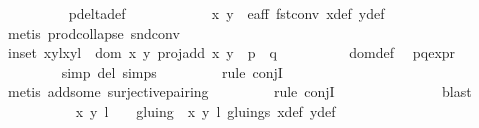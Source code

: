 \begin{isabellebody}
\ \ \ \ \ \ \ \ \isamarkupfalse%
\ p{\isacharunderscore}delta{\isacharprime}{\isacharunderscore}def\ \isanewline
\ \ \ \ \ \ \ \ \isamarkupfalse%
\ {\isacartoucheopen}{\isasymtau}\ {\isacharparenleft}x{\isacharprime}{\isacharcomma}\ y{\isacharprime}{\isacharparenright}\ {\isasymin}\ e{\isacharunderscore}aff{\isacartoucheclose}\ fst{\isacharunderscore}conv\ x{\isacharprime}{\isacharprime}{\isacharunderscore}def\ y{\isacharprime}{\isacharprime}{\isacharunderscore}def\ \isanewline
\ \ \ \ \ \ \ \ \isamarkupfalse%
\ {\isacharparenleft}metis\ prod{\isachardot}collapse\ snd{\isacharunderscore}conv{\isacharparenright}\isanewline
\ \ \ \ \ \ \isamarkupfalse%
\ in{\isacharunderscore}set{\isacharcolon}\ {\isachardoublequoteopen}{\isacharparenleft}{\isacharparenleft}{\isacharparenleft}x{\isacharcomma}y{\isacharparenright}{\isacharcomma}l{\isacharparenright}{\isacharcomma}{\isacharparenleft}{\isacharparenleft}x{\isacharprime}{\isacharprime}{\isacharcomma}y{\isacharprime}{\isacharprime}{\isacharparenright}{\isacharcomma}l{\isacharprime}{\isacharplus}{}{\isacharparenright}{\isacharparenright}\ {\isasymin}\ {\isacharparenleft}dom\ {\isacharparenleft}{\isasymlambda}{\isacharparenleft}x{\isacharcomma}\ y{\isacharparenright}{\isachardot}\ proj{\isacharunderscore}add\ x\ y{\isacharparenright}\ {\isasyminter}\ p\ {\isasymtimes}\ q{\isacharparenright}{\isachardoublequoteclose}\isanewline
\ \ \ \ \ \ \ \ \isamarkupfalse%
\ dom{\isacharunderscore}def\ \isamarkupfalse%
\ p{\isacharunderscore}q{\isacharunderscore}expr\ \isanewline
\ \ \ \ \ \ \ \ \isamarkupfalse%
{\isacharparenleft}simp\ del{\isacharcolon}\ {\isasymtau}{\isachardot}simps{\isacharparenright}\isanewline
\ \ \ \ \ \ \ \ \isamarkupfalse%
{\isacharparenleft}rule\ conjI{\isacharparenright}\isanewline
\ \ \ \ \ \ \ \ \isamarkupfalse%
\ {\isacharparenleft}metis\ add{\isacharunderscore}some\ surjective{\isacharunderscore}pairing{\isacharparenright}\isanewline
\ \ \ \ \ \ \ \ \isamarkupfalse%
{\isacharparenleft}rule\ conjI{\isacharparenright}\ \ \ \ \ \isanewline
\ \ \ \ \ \ \ \ \isamarkupfalse%
\ blast\isanewline
\ \ \ \ \ \ \ \ \isamarkupfalse%
\ {\isacartoucheopen}{\isacharparenleft}{\isasymtau}\ {\isacharparenleft}x{\isacharprime}{\isacharcomma}\ y{\isacharprime}{\isacharparenright}{\isacharcomma}\ l{\isacharprime}\ {\isacharplus}\ {}{\isacharparenright}\ {\isasymin}\ gluing\ {\isacharbackquote}{\isacharbackquote}\ {\isacharbraceleft}{\isacharparenleft}{\isacharparenleft}x{\isacharprime}{\isacharcomma}\ y{\isacharprime}{\isacharparenright}{\isacharcomma}\ l{\isacharprime}{\isacharparenright}{\isacharbraceright}{\isacartoucheclose}\ gluings{\isacharparenleft}{}{\isacharparenright}\ x{\isacharprime}{\isacharprime}{\isacharunderscore}def\ y{\isacharprime}{\isacharprime}{\isacharunderscore}def\ \isamarkupfalse%

\end{isabellebody}
